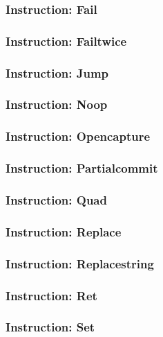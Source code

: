 \subsubsection{Instruction: Fail}

\subsubsection{Instruction: Failtwice}

\subsubsection{Instruction: Jump}

\subsubsection{Instruction: Noop}

\subsubsection{Instruction: Opencapture}

\subsubsection{Instruction: Partialcommit}

\subsubsection{Instruction: Quad}

\subsubsection{Instruction: Replace}

\subsubsection{Instruction: Replacestring}

\subsubsection{Instruction: Ret}

\subsubsection{Instruction: Set}

